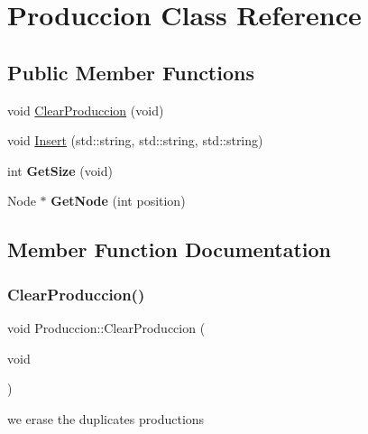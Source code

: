 \hypertarget{classProduccion}{}\section{Produccion Class Reference}
\label{classProduccion}
\subsection*{Public Member Functions}
\begin{DoxyCompactItemize}
\item 
void \hyperlink{classProduccion_a7ddb6e615717aefd0f2ed7882dab617f}{Clear\+Produccion} (void)
\item 
void \hyperlink{classProduccion_a5b6a6304f6984b2247dc52707b50d51d}{Insert} (std\+::string, std\+::string, std\+::string)
\item 
\mbox{\label{classProduccion_aac707505e20c194e315d032b97db363e}} 
int {\bfseries Get\+Size} (void)
\item 
\mbox{\label{classProduccion_a4f5cbc7f7b2203dcafffb481fbaa8d56}} 
Node $\ast$ {\bfseries Get\+Node} (int position)
\end{DoxyCompactItemize}


\subsection{Member Function Documentation}
\mbox{\label{classProduccion_a7ddb6e615717aefd0f2ed7882dab617f}} 
\subsubsection{\texorpdfstring{Clear\+Produccion()}{ClearProduccion()}}
{\footnotesize\ttfamily void Produccion\+::\+Clear\+Produccion (\begin{DoxyParamCaption}\item[{void}]{ }\end{DoxyParamCaption})}

we erase the duplicates productions \mbox{\label{classProduccion_a5b6a6304f6984b2247dc52707b50d51d}} 

